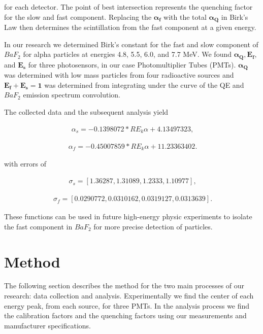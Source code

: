 \documentclass[aip, jmp, amssymb, amsmath, reprint, floatfix]{revtex4-1}
\begin{document}
for each detector. The point of best intersection represents the quenching factor for the slow and fast component. Replacing the $\bm{\alpha_f}$ with the total $\bm{\alpha_Q}$ in Birk's Law then determines the scintillation from the fast component at a given energy. 

In our research we determined Birk's constant for the fast and slow component of $BaF_2$ for alpha particles at energies 4.8, 5.5, 6.0, and 7.7 MeV. We found $\bm{\alpha_Q, E_f,}$ and $\bm{E_s}$ for three photosensors, in our case Photomultiplier Tubes (PMTs). $\bm{\alpha_Q}$ was determined with low mass particles from four radioactive sources and $\bm{E_f + E_s = 1}$ was determined from integrating under the curve of the QE and $BaF_2$ emission spectrum convolution. 

The collected data and the subsequent analysis yield 

\begin{eqnarray}
\ \alpha_s = -0.1398072 * RE_k\alpha + 4.13497323 
\label{eq:five},
\end{eqnarray}

\begin{eqnarray}
\ \alpha_f = -0.45007859 * RE_k\alpha + 11.23363402
\label{eq:six}.
\end{eqnarray}

with errors of 

\begin{eqnarray}
\ \sigma_s = [1.36287, 1.31089, 1.2333, 1.10977]
\label{eq:seven},
\end{eqnarray}

\begin{eqnarray}
\ \sigma_f = [0.0290772, 0.0310162, 0.0319127, 0.0313639]
\label{eq:eight}.
\end{eqnarray}

These functions can be used in future high-energy physic experiments to isolate the fast component in $BaF_2$ for more precise detection of particles. 


\section{\label{sec:level1}Method}

The following section describes the method for the two main processes of our research: data collection and analysis. Experimentally we find the center of each energy peak, from each source, for three PMTs. In the analysis process we find the calibration factors and the quenching factors using our measurements and manufacturer specifications. 
\end{document}
